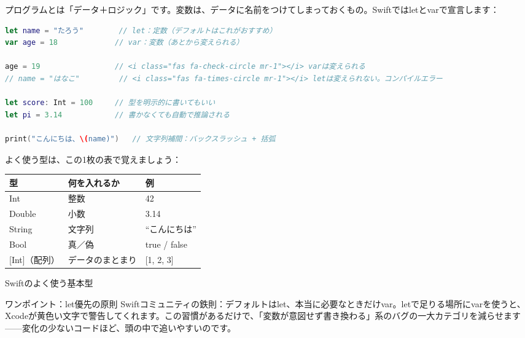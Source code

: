 


プログラムとは「データ＋ロジック」です。変数は、データに名前をつけてしまっておくもの。Swiftではletとvarで宣言します：

\begin{lstlisting}[language=Swift]
let name = "たろう"        // let：定数（デフォルトはこれがおすすめ）
var age = 18             // var：変数（あとから変えられる）

age = 19                 // <i class="fas fa-check-circle mr-1"></i> varは変えられる
// name = "はなこ"         // <i class="fas fa-times-circle mr-1"></i> letは変えられない。コンパイルエラー

let score: Int = 100     // 型を明示的に書いてもいい
let pi = 3.14            // 書かなくても自動で推論される

print("こんにちは、\(name)")   // 文字列補間：バックスラッシュ + 括弧
\end{lstlisting}

よく使う型は、この1枚の表で覚えましょう：

\begin{center}
\begin{tabularx}{\linewidth}{|X|X|X|}
\hline
\textbf{型} & \textbf{何を入れるか} & \textbf{例} \tabularnewline
\hline
Int & 整数 & 42 \tabularnewline
Double & 小数 & 3.14 \tabularnewline
String & 文字列 & “こんにちは” \tabularnewline
Bool & 真／偽 & true / false \tabularnewline
{}[Int]（配列） & データのまとまり & {}[1, 2, 3] \tabularnewline
\hline
\end{tabularx}
\end{center}

\begin{center}\small\color{gray}Swiftのよく使う基本型\end{center}

\begin{tcbinfo}{ワンポイント：let優先の原則}
Swiftコミュニティの鉄則：デフォルトはlet、本当に必要なときだけvar。letで足りる場所にvarを使うと、Xcodeが黄色い文字で警告してくれます。この習慣があるだけで、「変数が意図せず書き換わる」系のバグの一大カテゴリを減らせます——変化の少ないコードほど、頭の中で追いやすいのです。

\end{tcbinfo}


